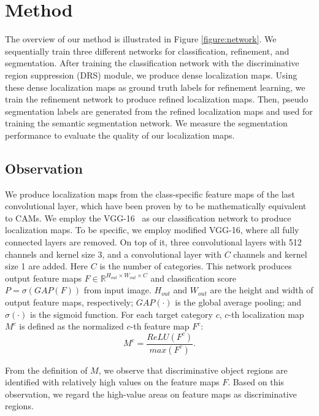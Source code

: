\documentclass[letterpaper]{article} \usepackage{aaai21}  \usepackage{times}  \usepackage{helvet} \usepackage{courier}  \usepackage[hyphens]{url}  \usepackage{graphicx} \urlstyle{rm} \def\UrlFont{\rm}  \usepackage{natbib}  \usepackage{caption} \frenchspacing  \setlength{\pdfpagewidth}{8.5in}  \setlength{\pdfpageheight}{11in}
\begin{document}
\section{Method}

The overview of our method is illustrated in Figure \ref{figure:network}.
We sequentially train three different networks for classification, refinement, and segmentation.
After training the classification network with the discriminative region suppression (DRS) module, we produce dense localization maps.
Using these dense localization maps as ground truth labels for refinement learning, we train the refinement network to produce refined localization maps.
Then, pseudo segmentation labels are generated from the refined localization maps and used for training the semantic segmentation network.
We measure the segmentation performance to evaluate the quality of our localization maps.


\subsection{Observation}
\label{method:1}
We produce localization maps from the class-specific feature maps of the last convolutional layer, which have been proven by \cite{zhang2018adversarial} to be mathematically equivalent to CAMs.
We employ the VGG-16~\cite{simonyan2014very} as our classification network to produce localization maps.
To be specific, we employ modified VGG-16, where all fully connected layers are removed. On top of it, three convolutional layers with 512 channels and kernel size 3, and a convolutional layer with $C$ channels and kernel size 1 are added. Here $C$ is the number of categories.
This network produces output feature maps $F \in \mathbb{R}^{H_{out} \times W_{out} \times C}$ and classification score $P=\sigma(GAP(F))$ from input image. 
$H_{out}$ and $W_{out}$ are the height and width of output feature maps, respectively; $GAP(\cdot)$ is the global average pooling; and $\sigma(\cdot)$ is the sigmoid function.
For each target category $c$, $c$-th localization map $M^{c}$ is defined as the normalized $c$-th feature map $F^{c}$:
\begin{equation}
    M^c=\frac{ReLU(F^c)}{max(F^c)}.
\end{equation}

From the definition of $M$, we observe that discriminative object regions are identified with relatively high values on the feature maps $F$.
Based on this observation, we regard the high-value areas on feature maps as discriminative regions.
\end{document}
